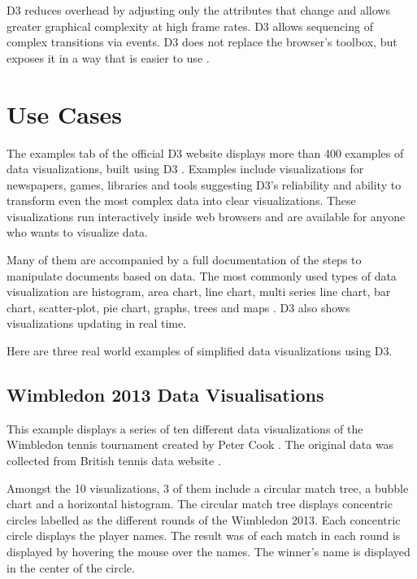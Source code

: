 \documentclass[9pt,twocolumn,twoside]{../../styles/osajnl}
\begin{document}
D3 reduces overhead by adjusting only the attributes that change and allows greater graphical complexity at high frame rates. D3 allows sequencing of complex transitions via events. D3 does not replace the browser’s toolbox, but exposes it in a way that is easier to use \cite{www-d3}.

\section{Use Cases}

The examples tab of the official D3 website displays more than 400 examples of data visualizations, built using D3 \cite{www-gallery}. Examples include visualizations for newspapers, games, libraries and tools suggesting D3's reliability and ability to transform even the most complex data into clear visualizations. These visualizations run interactively inside web browsers and are available for anyone who wants to visualize data.

Many of them are accompanied by a full documentation of the steps to manipulate documents based on data. The most commonly used types of data visualization are histogram, area chart, line chart, multi series line chart, bar chart, scatter-plot, pie chart, graphs, trees and maps \cite{www-gallery}. D3 also shows visualizations updating in real time.

Here are three real world examples of simplified data visualizations using D3.

\subsection{Wimbledon 2013 Data Visualisations}
This example displays a series of ten different
data visualizations of the Wimbledon tennis tournament created by Peter Cook \cite{www-cook}. The original data was collected from British tennis data
website \cite{www-tennis}.

Amongst the 10 visualizations, 3 of them include a circular match tree, a bubble chart and a horizontal histogram. The circular match tree displays concentric circles labelled as the different rounds of the Wimbledon 2013. Each concentric circle displays the player names. The result was of each match in each round is displayed by hovering the mouse over the names. The winner's name is displayed in the center of the circle.
\end{document}
